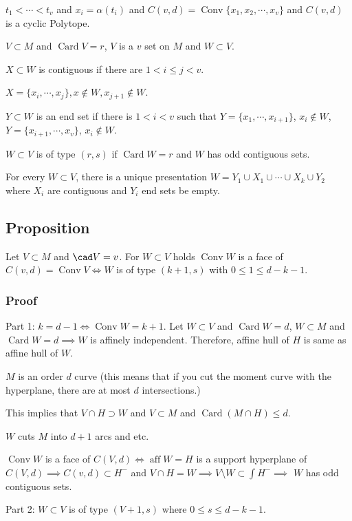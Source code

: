 \documentclass[11pt]{article}
\def\aff{\operatorname{aff}}
\def\conv{\operatorname{Conv}}
\def\card{\operatorname{Card}}
\begin{document}
{{\(t_1 < \cdots < t_v\) and \(x_i = \alpha(t_i)\) and \(C(v, d) = \conv \{x_1, x_2,
   \cdots, x_v\}\) and \(C(v, d)\) is a cyclic Polytope.

\(V \subset M\) and \(\card V = r\), \(V\) is a \(v\) set on \(M\) and \(W \subset V\).

\(X \subset W\) is contiguous if there are \(1 < i \le j < v\).

\(X = \{x_i, \cdots, x_j\}, x \notin W, x_{j+1} \notin W\).

\(Y \subset W\) is an end set if there is \(1 < i < v\) such that \(Y = \{x_1,
   \cdots, x_{i+1}\}\), \(x_i \notin W\), \(Y = \{x_{i+1}, \cdots, x_v\}\), \(x_i
   \notin W\).

\(W \subset V\) is of type \((r, s)\) if \(\card W = r\) and \(W\) has odd contiguous
sets.

For every \(W \subset V\), there is a unique presentation \(W = Y_1 \cup X_1
   \cup \cdots \cup X_k \cup Y_2\) where \(X_i\) are contiguous and \(Y_i\) end sets
be empty.
\subsection{Proposition}
\label{sec:org6410e0d}
Let \(V \subset M\) and \(\cad V = v\). For \(W \subset V\) holds \(\conv W\) is a
face of \(C(v, d) = \conv V \iff W\) is of type \((k+1, s)\) with \(0 \le 1 \le d-
   k- 1\).
\subsubsection{Proof}
\label{sec:org45c62d3}
Part 1: \(k = d-1 \iff \conv W = k+1\). Let \(W \subset V\) and \(\card W = d\),
\(W \subset M\) and \(\card W = d \implies W\) is affinely independent.
Therefore, affine hull of \(H\) is same as affine hull of \(W\).

\(M\) is an order \(d\) curve (this means that if you cut the moment curve with
the hyperplane, there are at most \(d\) intersections.)

This implies that \(V \cap H \supset W\) and \(V \subset M\) and \(\card(M \cap
    H) \le d\). 

\(W\) cuts \(M\) into \(d+1\) arcs and etc.

\(\conv W\) is a face of \(C(V, d) \iff \aff W = H\) is a support hyperplane of
\(C(V, d) \implies C(v, d) \subset H^{-}\) and \(V \cap H = W \implies V
    \setminus W \subset \int H^{-} \implies\) \(W\) has odd contiguous sets.

Part 2: \(W \subset V\) is of type \((V + 1, s)\) where \(0 \le s \le d - k- 1\).

}}
\end{document}

